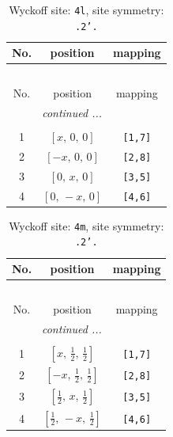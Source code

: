 \documentclass[fleqn,8pt]{jsarticle}
\begin{document}
\renewcommand{\arraystretch}{1.2}
\begin{longtable}{ccc}
\caption{Wyckoff site: {\tt 4l}, site symmetry: {\tt .2'.}}
 \\
 \hline \hline
No. & position & mapping \\ \hline \endfirsthead

\multicolumn{2}{l}{\tablename\ \thetable{}} \\
 \hline \hline
No. & position & mapping \\ \hline \endhead

 \hline \hline
\multicolumn{2}{r}{\footnotesize\it continued ...} \\ \endfoot

 \hline \hline
\multicolumn{2}{r}{} \\ \endlastfoot

1 & $\left[ x,\, 0,\, 0 \right]$ & {\tt [1,7]} \\ \hline
2 & $\left[ - x,\, 0,\, 0 \right]$ & {\tt [2,8]} \\ \hline
3 & $\left[ 0,\, x,\, 0 \right]$ & {\tt [3,5]} \\ \hline
4 & $\left[ 0,\, - x,\, 0 \right]$ & {\tt [4,6]} \\
\end{longtable}
\renewcommand{\arraystretch}{1.2}
\begin{longtable}{ccc}
\caption{Wyckoff site: {\tt 4m}, site symmetry: {\tt .2'.}}
 \\
 \hline \hline
No. & position & mapping \\ \hline \endfirsthead

\multicolumn{2}{l}{\tablename\ \thetable{}} \\
 \hline \hline
No. & position & mapping \\ \hline \endhead

 \hline \hline
\multicolumn{2}{r}{\footnotesize\it continued ...} \\ \endfoot

 \hline \hline
\multicolumn{2}{r}{} \\ \endlastfoot

1 & $\left[ x,\, \frac{1}{2},\, \frac{1}{2} \right]$ & {\tt [1,7]} \\ \hline
2 & $\left[ - x,\, \frac{1}{2},\, \frac{1}{2} \right]$ & {\tt [2,8]} \\ \hline
3 & $\left[ \frac{1}{2},\, x,\, \frac{1}{2} \right]$ & {\tt [3,5]} \\ \hline
4 & $\left[ \frac{1}{2},\, - x,\, \frac{1}{2} \right]$ & {\tt [4,6]} \\
\end{longtable}
\end{document}
